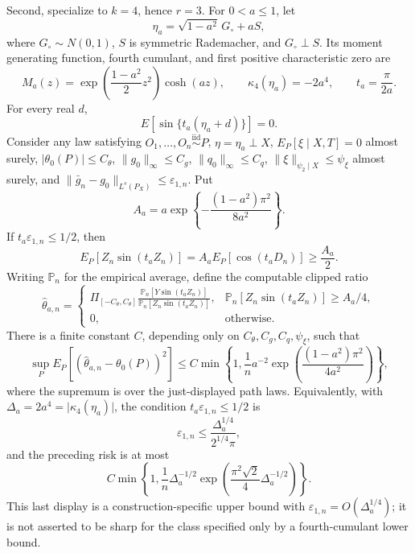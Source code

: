 Second, specialize to \(k=4\), hence \(r=3\).  For \(0<a\le1\), let
\[
 \eta_a=\sqrt{1-a^2}\,G_{\circ}+aS,
\]
where \(G_{\circ}\sim N(0,1)\), \(S\) is symmetric Rademacher, and \(G_{\circ}\perp S\).  Its moment generating function, fourth cumulant, and first positive characteristic zero are
\[
 M_a(z)=\exp\!\left(\frac{1-a^2}{2}z^2\right)\cosh(az),
 \qquad
 \kappa_4(\eta_a)=-2a^4,
 \qquad
 t_a=\frac{\pi}{2a}.
\]
For every real \(d\),
\[
 E\!\left[\sin\{t_a(\eta_a+d)\}\right]=0.
\]
Consider any law satisfying \(O_1,\ldots,O_n\stackrel{\mathrm{iid}}{\sim}P\), \(\eta=\eta_a\perp X\), \(E_P[\xi\mid X,T]=0\) almost surely, \(\lvert\theta_0(P)\rvert\le C_{\theta}\), \(\lVert g_0\rVert_{\infty}\le C_g\), \(\lVert q_0\rVert_{\infty}\le C_q\), \(\lVert\xi\rVert_{\psi_2\mid X}\le\psi_{\xi}\) almost surely, and \(\lVert\bar g_n-g_0\rVert_{L^s(P_X)}\le\varepsilon_{1,n}\).  Put
\[
 A_a=a\exp\!\left\{-\frac{(1-a^2)\pi^2}{8a^2}\right\}.
\]
If \(t_a\varepsilon_{1,n}\le1/2\), then
\[
 E_P\!\left[Z_n\sin(t_aZ_n)\right]
 =A_aE_P[\cos(t_aD_n)]
 \ge\frac{A_a}{2}.
\]
Writing \(\mathbb P_n\) for the empirical average, define the computable clipped ratio
\[
 \widehat\theta_{a,n}
 =
 \begin{cases}
 \displaystyle
 \Pi_{[-C_{\theta},C_{\theta}]}
 \frac{\mathbb P_n[Y\sin(t_aZ_n)]}
      {\mathbb P_n[Z_n\sin(t_aZ_n)]},
 &\displaystyle
 \mathbb P_n[Z_n\sin(t_aZ_n)]\ge A_a/4,\\[3mm]
 0,&\text{otherwise}.
 \end{cases}
\]
There is a finite constant \(C\), depending only on \(C_{\theta},C_g,C_q,\psi_{\xi}\), such that
\[
 \sup_P E_P\!\left[(\widehat\theta_{a,n}-\theta_0(P))^2\right]
 \le
 C\min\!\left\{
  1,\frac{1}{n}a^{-2}
  \exp\!\left(\frac{(1-a^2)\pi^2}{4a^2}\right)
 \right\},
\]
where the supremum is over the just-displayed path laws.  Equivalently, with \(\Delta_a=2a^4=\lvert\kappa_4(\eta_a)\rvert\), the condition \(t_a\varepsilon_{1,n}\le1/2\) is
\[
 \varepsilon_{1,n}\le\frac{\Delta_a^{1/4}}{2^{1/4}\pi},
\]
and the preceding risk is at most
\[
 C\min\!\left\{
  1,\frac{1}{n}\Delta_a^{-1/2}
  \exp\!\left(\frac{\pi^2\sqrt2}{4}\Delta_a^{-1/2}\right)
 \right\}.
\]
This last display is a construction-specific upper bound with \(\varepsilon_{1,n}=O(\Delta_a^{1/4})\); it is not asserted to be sharp for the class specified only by a fourth-cumulant lower bound.